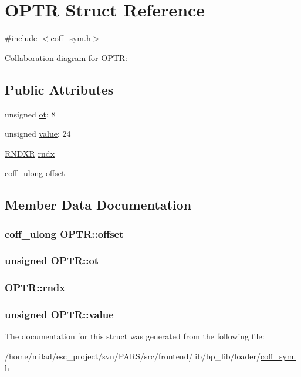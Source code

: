 \hypertarget{structOPTR}{
\section{OPTR Struct Reference}
\label{structOPTR}
}


{\ttfamily \#include $<$coff\_\-sym.h$>$}



Collaboration diagram for OPTR:
\subsection*{Public Attributes}
\begin{DoxyCompactItemize}
\item 
unsigned \hyperlink{structOPTR_a395372ba2e7eb725906f228749c39dd5}{ot}: 8
\item 
unsigned \hyperlink{structOPTR_a6539af4ff0b28e701633de620abfabbe}{value}: 24
\item 
\hyperlink{structRNDXR}{RNDXR} \hyperlink{structOPTR_a3894af1c17210c3c3e33577ef34161fa}{rndx}
\item 
coff\_\-ulong \hyperlink{structOPTR_af59ba1a417a747c35426cb6edd3c3a7a}{offset}
\end{DoxyCompactItemize}


\subsection{Member Data Documentation}
\hypertarget{structOPTR_af59ba1a417a747c35426cb6edd3c3a7a}{
\subsubsection[{offset}]{\setlength{\rightskip}{0pt plus 5cm}coff\_\-ulong {\bf OPTR::offset}}}
\label{structOPTR_af59ba1a417a747c35426cb6edd3c3a7a}
\hypertarget{structOPTR_a395372ba2e7eb725906f228749c39dd5}{
\subsubsection[{ot}]{\setlength{\rightskip}{0pt plus 5cm}unsigned {\bf OPTR::ot}}}
\label{structOPTR_a395372ba2e7eb725906f228749c39dd5}
\hypertarget{structOPTR_a3894af1c17210c3c3e33577ef34161fa}{
\subsubsection[{rndx}]{ {\bf OPTR::rndx}}}
\label{structOPTR_a3894af1c17210c3c3e33577ef34161fa}
\hypertarget{structOPTR_a6539af4ff0b28e701633de620abfabbe}{
\subsubsection[{value}]{\setlength{\rightskip}{0pt plus 5cm}unsigned {\bf OPTR::value}}}
\label{structOPTR_a6539af4ff0b28e701633de620abfabbe}


The documentation for this struct was generated from the following file:\begin{DoxyCompactItemize}
\item 
/home/milad/esc\_\-project/svn/PARS/src/frontend/lib/bp\_\-lib/loader/\hyperlink{coff__sym_8h}{coff\_\-sym.h}\end{DoxyCompactItemize}

